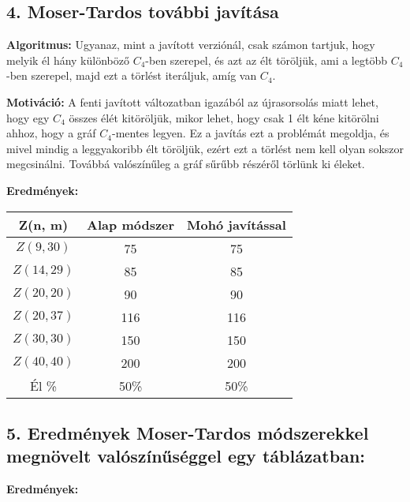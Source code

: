 \documentclass[12pt,a4paper]{article}
\begin{document}
\subsection*{4. Moser-Tardos további javítása}

\textbf{Algoritmus:} Ugyanaz, mint a javított verziónál, csak számon tartjuk, hogy melyik él hány különböző $C_4$-ben szerepel, és azt az élt töröljük, ami a legtöbb $C_4$-ben szerepel, majd ezt a törlést iteráljuk, amíg van $C_4$.

\textbf{Motiváció:} A fenti javított változatban igazából az újrasorsolás miatt lehet, hogy egy $C_4$ összes élét kitöröljük, mikor lehet, hogy csak 1 élt kéne kitörölni ahhoz, hogy a gráf $C_4$-mentes legyen. Ez a javítás ezt a problémát megoldja, és mivel mindig a leggyakoribb élt töröljük, ezért ezt a törlést nem kell olyan sokszor megcsinálni. Továbbá valószínűleg a gráf sűrűbb részéről törlünk ki éleket.

\textbf{Eredmények:}
\begin{table}[H]
\centering
\begin{tabular}{|c|c|c|}
\hline
\textbf{Z(n, m)} & \textbf{Alap módszer} & \textbf{Mohó javítással} \\
\hline
$Z(9,30)$  & 75 & 75 \\
$Z(14, 29)$ & 85 & 85 \\
$Z(20, 20)$ & 90 & 90 \\
$Z(20, 37)$ & 116 & 116 \\
$Z(30, 30)$ & 150 & 150 \\
$Z(40, 40)$ & 200 & 200 \\
\hline
Él \% & 50\% & 50\% \\
\hline
\end{tabular}
\end{table}

\subsection*{5. Eredmények Moser-Tardos módszerekkel megnövelt valószínűséggel egy táblázatban:}

\textbf{Eredmények:} 
\end{document}
